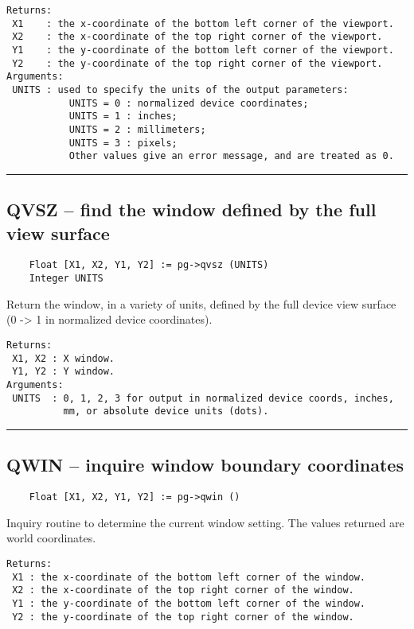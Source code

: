\begin{verbatim}
Returns:
 X1    : the x-coordinate of the bottom left corner of the viewport. 
 X2    : the x-coordinate of the top right corner of the viewport. 
 Y1    : the y-coordinate of the bottom left corner of the viewport. 
 Y2    : the y-coordinate of the top right corner of the viewport. 
Arguments:
 UNITS : used to specify the units of the output parameters:
           UNITS = 0 : normalized device coordinates;
           UNITS = 1 : inches;
           UNITS = 2 : millimeters;
           UNITS = 3 : pixels;
           Other values give an error message, and are treated as 0. 
\end{verbatim}

\hrule

\subsection*{QVSZ -- find the window defined by the full view surface }

\begin{verbatim}
    Float [X1, X2, Y1, Y2] := pg->qvsz (UNITS)
    Integer UNITS
\end{verbatim}

Return the window, in a variety of units, defined by the full device
view surface (0 -> 1 in normalized device coordinates).

\begin{verbatim}
Returns:
 X1, X2 : X window.
 Y1, Y2 : Y window.
Arguments:
 UNITS  : 0, 1, 2, 3 for output in normalized device coords, inches,
          mm, or absolute device units (dots). 
\end{verbatim}

\hrule

\subsection*{QWIN -- inquire window boundary coordinates }

\begin{verbatim}
    Float [X1, X2, Y1, Y2] := pg->qwin ()
\end{verbatim}

Inquiry routine to determine the current window setting.  The values
returned are world coordinates.

\begin{verbatim}
Returns:
 X1 : the x-coordinate of the bottom left corner of the window. 
 X2 : the x-coordinate of the top right corner of the window. 
 Y1 : the y-coordinate of the bottom left corner of the window. 
 Y2 : the y-coordinate of the top right corner of the window. 
\end{verbatim}

